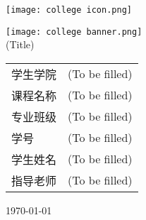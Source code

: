 \begin{titlepage}
  \texttt{[image: college icon.png]}
  \begin{center}
    \vspace{1cm}
    \texttt{[image: college banner.png]}\\
    \vspace{2cm}
    {
      \selectfont \Huge{(Title)}\\
    }
    \vspace{3cm}
    \Large
    \begin{tabular}{l c}
      学生学院 & (To be filled)\\ \cline{2-2}
      课程名称 & (To be filled)\\ \cline{2-2}
      专业班级 & (To be filled)\\ \cline{2-2}
      学号 & (To be filled)\\ \cline{2-2}
      学生姓名 & (To be filled)\\ \cline{2-2}
      指导老师 & (To be filled)\\ \cline{2-2}
    \end{tabular}
    \vfill
    \today
    \vspace{4cm}
  \end{center}
\end{titlepage}

\newpage
\null
\thispagestyle{empty}

\newpage
{}
\tableofcontents
\thispagestyle{empty}
\newpage
\setcounter{page}{1}
